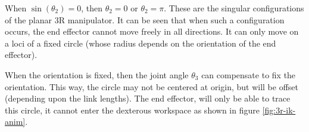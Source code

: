 When $\sin(\theta_2) = 0$, then $\theta_2 = 0$ or $\theta_2 = \pi$. These are the singular configurations of the planar 3R manipulator. It can be seen that when such a configuration occurs, the end effector cannot move freely in all directions. It can only move on a loci of a fixed circle (whose radius depends on the orientation of the end effector).

When the orientation is fixed, then the joint angle $\theta_3$ can compensate to fix the orientation. This way, the circle may not be centered at origin, but will be offset (depending upon the link lengths). The end effector, will only be able to trace this circle, it cannot enter the dexterous workspace as shown in figure \ref{fig:3r-ik-anim}.
